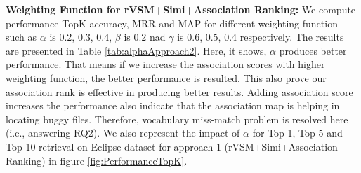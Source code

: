\documentclass[conference]{IEEEtran}
\begin{document}
\textbf{Weighting Function for rVSM+Simi+Association Ranking:}
We compute performance TopK accuracy, MRR and MAP for different weighting function such as  $\alpha$ is 0.2, 0.3, 0.4, $\beta$ is 0.2 nad $\gamma$ is 0.6, 0.5, 0.4 respectively. The results are presented in Table \ref{tab:alphaApproach2}. 
 Here, it shows, $\alpha$ produces better performance. That means if we increase the association scores with higher weighting function, the better performance is resulted. This also prove our association rank is effective in producing better results.
 Adding association score increases the performance also indicate that the association map is helping in locating buggy files. Therefore, vocabulary miss-match problem is resolved here (i.e., answering RQ2). 
 We also represent the impact of $\alpha$ for Top-1, Top-5 and Top-10 retrieval on Eclipse dataset for approach 1 (rVSM+Simi+Association Ranking) in figure \ref{fig:PerformanceTopK}.
\end{document}
